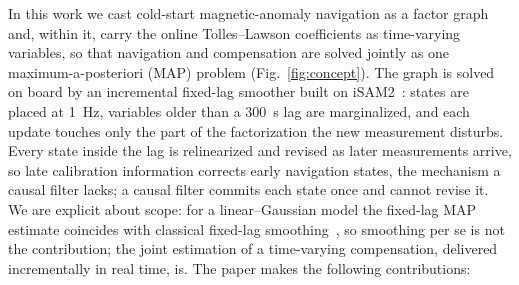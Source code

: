 \documentclass{IEEEtaes}
\begin{document}
In this work we cast cold-start magnetic-anomaly navigation as a factor graph
and, within it, carry the online Tolles--Lawson coefficients as time-varying
variables, so that navigation and compensation are solved jointly as one
maximum-a-posteriori (MAP) problem (Fig.~\ref{fig:concept}). The graph is
solved on board by an incremental fixed-lag smoother built on
iSAM2~\cite{kaess2012}: states are placed at \SI{1}{\hertz}, variables older
than a \SI{300}{\second} lag are marginalized, and each update touches only the
part of the factorization the new measurement disturbs. Every state inside the
lag is relinearized and revised as later measurements arrive, so late
calibration information corrects early navigation states, the mechanism a
causal filter lacks; a causal filter commits each state once and cannot revise
it. We are explicit about scope: for a linear--Gaussian model the fixed-lag MAP
estimate coincides with classical fixed-lag smoothing~\cite{rauch1965}, so
smoothing per se is not the contribution; the joint estimation of a
time-varying compensation, delivered incrementally in real time, is.
The paper makes the following contributions:
\end{document}
